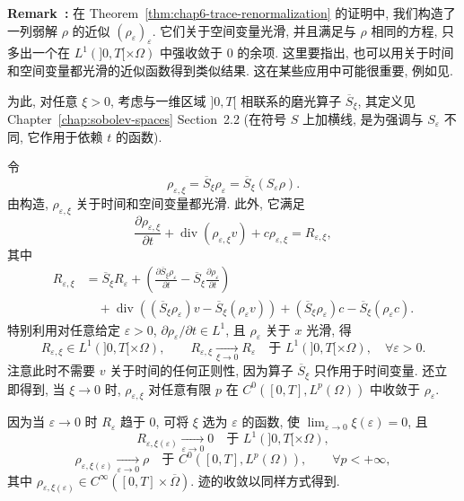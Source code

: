 \begin{sloppypar}
\par\noindent{}\textbf{Remark~\thechaptersixsectiononeremark:}\label{rem:chap6-space-time-smoothing}
在 Theorem~\ref{thm:chap6-trace-renormalization} 的证明中, 我们构造了一列弱解 $\rho$ 的近似 $(\rho_\varepsilon)_\varepsilon$. 它们关于空间变量光滑, 并且满足与 $\rho$ 相同的方程, 只多出一个在 $L^1(]0,T[\times\Omega)$ 中强收敛于 $0$ 的余项. 这里要指出, 也可以用关于时间和空间变量都光滑的近似函数得到类似结果. 这在某些应用中可能很重要, 例如见.

为此, 对任意 $\xi>0$, 考虑与一维区域 $]0,T[$ 相联系的磨光算子 $\overline S_\xi$, 其定义见 Chapter~\ref{chap:sobolev-spaces} Section~2.2 (在符号 $S$ 上加横线, 是为强调与 $S_\varepsilon$ 不同, 它作用于依赖 $t$ 的函数).

令
\[
 \rho_{\varepsilon,\xi}=\overline S_\xi\rho_\varepsilon
 =\overline S_\xi(S_\varepsilon\rho).
\]
由构造, $\rho_{\varepsilon,\xi}$ 关于时间和空间变量都光滑. 此外, 它满足
\[
 \frac{\partial\rho_{\varepsilon,\xi}}{\partial t}
 +\operatorname{div}(\rho_{\varepsilon,\xi}v)+c\rho_{\varepsilon,\xi}
 =R_{\varepsilon,\xi},
\]
其中
\[
 \begin{aligned}
 R_{\varepsilon,\xi}
 &=\overline S_\xi R_\varepsilon
 +\left(\frac{\partial\overline S_\xi\rho_\varepsilon}{\partial t}
 -\overline S_\xi\frac{\partial\rho_\varepsilon}{\partial t}\right)\\
 &\quad+\operatorname{div}\left((\overline S_\xi\rho_\varepsilon)v
 -\overline S_\xi(\rho_\varepsilon v)\right)
 +(\overline S_\xi\rho_\varepsilon)c
 -\overline S_\xi(\rho_\varepsilon c).
 \end{aligned}
\]
特别利用对任意给定 $\varepsilon>0$, $\partial\rho_\varepsilon/\partial t\in L^1$, 且 $\rho_\varepsilon$ 关于 $x$ 光滑, 得
\[
 R_{\varepsilon,\xi}\in L^1(]0,T[\times\Omega),
 \qquad
 R_{\varepsilon,\xi}\xrightarrow[\xi\to0]{}R_\varepsilon
 \quad\text{于 }L^1(]0,T[\times\Omega),
 \quad\forall\varepsilon>0.
\]
注意此时不需要 $v$ 关于时间的任何正则性, 因为算子 $\overline S_\xi$ 只作用于时间变量. 还立即得到, 当 $\xi\to0$ 时, $\rho_{\varepsilon,\xi}$ 对任意有限 $p$ 在 $C^0([0,T],L^p(\Omega))$ 中收敛于 $\rho_\varepsilon$.

因为当 $\varepsilon\to0$ 时 $R_\varepsilon$ 趋于 $0$, 可将 $\xi$ 选为 $\varepsilon$ 的函数, 使 $\lim_{\varepsilon\to0}\xi(\varepsilon)=0$, 且
\[
 R_{\varepsilon,\xi(\varepsilon)}\xrightarrow[\varepsilon\to0]{}0
 \quad\text{于 }L^1(]0,T[\times\Omega),
\]
\[
 \rho_{\varepsilon,\xi(\varepsilon)}\xrightarrow[\varepsilon\to0]{}\rho
 \quad\text{于 }C^0([0,T],L^p(\Omega)),
 \qquad\forall p<+\infty,
\]
其中 $\rho_{\varepsilon,\xi(\varepsilon)}\in C^\infty([0,T]\times\overline\Omega)$. 迹的收敛以同样方式得到.


\end{sloppypar}
